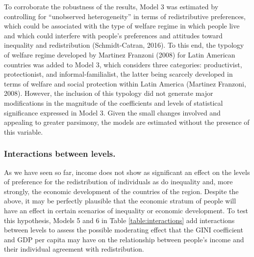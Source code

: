 \documentclass[utf8]{frontiersSCNS} %
\begin{document}
To corroborate the robustness of the results, Model 3 was estimated by controlling for “unobserved heterogeneity” in terms of redistributive preferences, which could be associated with the type of welfare regime in which people live and which could interfere with people’s preferences and attitudes toward inequality and redistribution (Schmidt-Catran, 2016). To this end, the typology of welfare regime developed by Martinez Franzoni (2008) for Latin American countries was added to Model 3, which considers three categories: productivist, protectionist, and informal-familialist, the latter being scarcely developed in terms of welfare and social protection within Latin America (Martinez Franzoni, 2008). However, the inclusion of this typology did not generate major modifications in the magnitude of the coefficients and levels of statistical significance expressed in Model 3. Given the small changes involved and appealing to greater parsimony, the models are estimated without the presence of this variable.

\subsubsection{Interactions between levels.}

As we have seen so far, income does not show as significant an effect on the levels of preference for the redistribution of individuals as do inequality and, more strongly, the economic development of the countries of the region. Despite the above, it may be perfectly plausible that the economic stratum of people will have an effect in certain scenarios of inequality or economic development. To test this hypothesis, Models 5 and 6 in Table \ref{table:interactions} add interactions between levels to assess the possible moderating effect that the GINI coefficient and GDP per capita may have on the relationship between people’s income and their individual agreement with redistribution.
\end{document}
